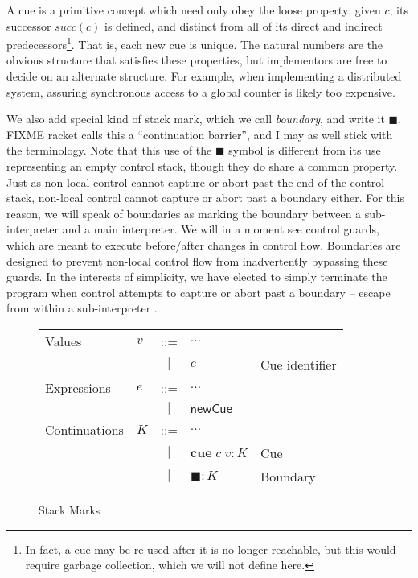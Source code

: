 \documentclass[11pt]{article}
\newcommand{\newhandler}{\textsf{newCue}}
\begin{document}
A cue is a primitive concept which need only obey the loose property:
given $c$, its successor $succ(c)$ is defined, and distinct from all of its direct and indirect predecessors\footnote{In fact, a cue may be re-used after it is no longer reachable, but this would require garbage collection, which we will not define here.}.
That is, each new cue is unique.
The natural numbers are the obvious structure that satisfies these properties, but implementors are free to decide on an alternate structure.
For example, when implementing a distributed system, assuring synchronous access to a global counter is likely too expensive.

We also add special kind of stack mark, which we call \emph{boundary}, and write it $\blacksquare$.
FIXME racket calls this a ``continuation barrier'', and I may as well stick with the terminology.
Note that this use of the $\blacksquare$ symbol is different from its use representing an empty control stack, though they do share a common property.
Just as non-local control cannot capture or abort past the end of the control stack, non-local control cannot capture or abort past a boundary either.
For this reason, we will speak of boundaries as marking the boundary between a sub-interpreter and a main interpreter.
We will in a moment see control guards, which are meant to execute before/after changes in control flow.
Boundaries are designed to prevent non-local control flow from inadvertently bypassing these guards.
In the interests of simplicity, we have elected to simply terminate the program when control attempts to capture or abort past a boundary -- escape from within a sub-interpreter .

\begin{figure}[h!]
\caption{Stack Marks}
\label{fig:addCues}

\begin{tabular}{llcll}
Values & $v$ & ::= & $\ldots$ \\
& & $|$ & $c$ & Cue identifier \\
Expressions & $e$ & ::= & $\ldots$ \\
& & $|$ & $\newhandler$ \\
Continuations & $K$ & ::= & $\ldots$ \\
& & $|$ & $\textbf{cue}\;c\;v:K$ & Cue \\
& & $|$ & $\blacksquare:K$ & Boundary \\
\end{tabular}
\end{figure}
\end{document}
